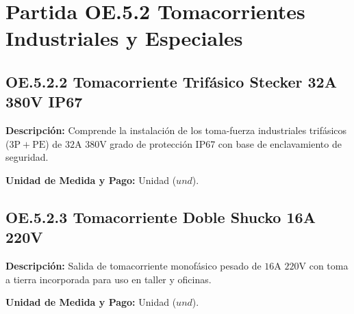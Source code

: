\section{Partida OE.5.2 Tomacorrientes Industriales y Especiales}

\subsection{OE.5.2.2 Tomacorriente Trifásico Stecker 32A 380V IP67}
\textbf{Descripción:} Comprende la instalación de los toma-fuerza industriales trifásicos ($3\text{P}+\text{PE}$) de $32\text{A}$ $380\text{V}$ grado de protección IP67 con base de enclavamiento de seguridad.

\textbf{Unidad de Medida y Pago:} Unidad ($und$).

\subsection{OE.5.2.3 Tomacorriente Doble Shucko 16A 220V}
\textbf{Descripción:} Salida de tomacorriente monofásico pesado de $16\text{A}$ $220\text{V}$ con toma a tierra incorporada para uso en taller y oficinas.

\textbf{Unidad de Medida y Pago:} Unidad ($und$).
